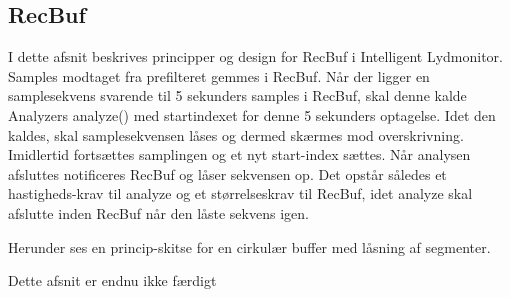 \subsection{RecBuf}
I dette afsnit beskrives principper og design for RecBuf i Intelligent Lydmonitor.
Samples modtaget fra prefilteret gemmes i RecBuf. Når der ligger en samplesekvens svarende til 5 sekunders samples i RecBuf, skal denne kalde Analyzers analyze() med startindexet for denne 5 sekunders optagelse. Idet den kaldes, skal samplesekvensen låses og dermed skærmes mod overskrivning. Imidlertid fortsættes samplingen og et nyt start-index sættes. Når analysen afsluttes notificeres RecBuf og låser sekvensen op. Det opstår således et hastigheds-krav til analyze og et størrelseskrav til RecBuf, idet analyze skal afslutte inden RecBuf når den låste sekvens igen. 

Herunder ses en princip-skitse for en cirkulær buffer med låsning af segmenter.

Dette afsnit er endnu ikke færdigt
